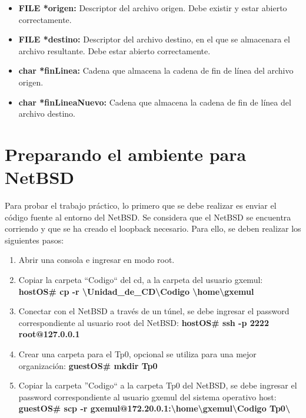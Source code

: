 \documentclass[a4paper,10pt]{article}
\begin{document}
  \begin{itemize}
  \item {\bf FILE *origen:}
    Descriptor del archivo origen. Debe existir y estar abierto correctamente.
  \item {\bf FILE *destino:}
    Descriptor del archivo destino, en el que se almacenara el archivo resultante. Debe estar abierto correctamente.
  \item {\bf char *finLinea:}
    Cadena que almacena la cadena de fin de l\'inea del archivo origen.
  \item {\bf char *finLineaNuevo:}
    Cadena que almacena la cadena de fin de l\'inea del archivo destino.
  \end{itemize}

\section{Preparando el ambiente para NetBSD}
  Para probar el trabajo pr\'actico, lo primero que se debe realizar es enviar el c\'odigo fuente al entorno
  del NetBSD. Se considera que el NetBSD se encuentra corriendo y que se ha creado el loopback necesario. Para ello, se deben realizar los siguientes pasos:
  \begin{enumerate}
   \item Abrir una consola e ingresar en modo root.
   \item Copiar la carpeta ``Codigo`` del cd, a la carpeta del usuario gxemul:
    \newline 
      {\bf hostOS\# cp -r \textbackslash Unidad\_de\_CD\textbackslash Codigo \textbackslash home\textbackslash gxemul}
   \item Conectar con el NetBSD a trav\'es de un t\'unel, se debe ingresar el password correspondiente al 
	 usuario root del NetBSD:
    \newline
      {\bf hostOS\# ssh -p 2222 root@127.0.0.1}
   \item Crear una carpeta para el Tp0, opcional se utiliza para una mejor organizaci\'on:
    \newline 
    {\bf guestOS\# mkdir Tp0}
   \item Copiar la carpeta ''Codigo`` a la carpeta Tp0 del NetBSD, se debe ingresar el password correspondiente al
         usuario gxemul del sistema operativo host:
   \newline
    {\bf guestOS\# scp -r gxemul@172.20.0.1:\textbackslash home\textbackslash gxemul\textbackslash Codigo \newline Tp0\textbackslash }
  \end{enumerate}
\end{document}
